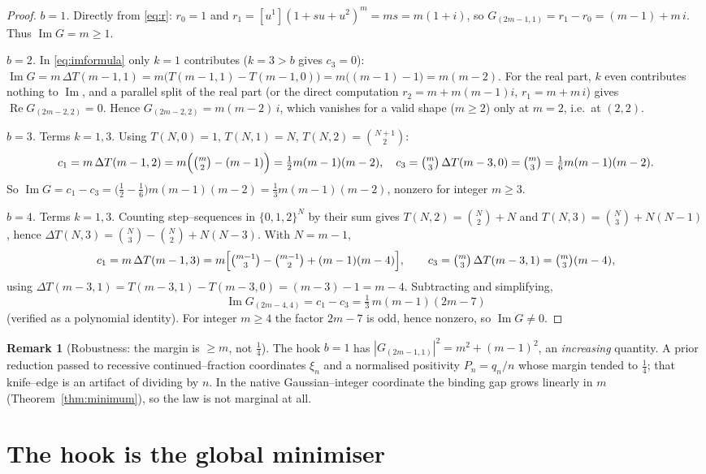 \documentclass[11pt]{article}
\theoremstyle{definition}
\newtheorem{remark}{Remark}
\renewcommand{\Re}{\operatorname{Re}}
\renewcommand{\Im}{\operatorname{Im}}
\newcommand{\im}{\Im}
\begin{document}
\begin{proof}
\emph{$b=1$.}  Directly from \eqref{eq:r}: $r_0=1$ and
$r_1=[u^1](1+su+u^2)^m=ms=m(1+i)$, so
$G_{(2m-1,1)}=r_1-r_0=(m-1)+m\,i$.  Thus $\im G=m\ge1$.

\emph{$b=2$.}  In \eqref{eq:imformula} only $k=1$ contributes ($k=3>b$ gives
$c_3=0$):
$\im G=m\,\Delta T(m-1,1)=m\bigl(T(m-1,1)-T(m-1,0)\bigr)=m\bigl((m-1)-1\bigr)=m(m-2)$.
For the real part, $k$ even contributes nothing to $\im$, and a parallel split of
the real part (or the direct computation $r_2=m+m(m-1)i$, $r_1=m+m\,i$) gives
$\Re G_{(2m-2,2)}=0$.  Hence $G_{(2m-2,2)}=m(m-2)\,i$, which vanishes for a valid
shape ($m\ge2$) only at $m=2$, i.e.\ at $(2,2)$.

\emph{$b=3$.}  Terms $k=1,3$.  Using $T(N,0)=1$, $T(N,1)=N$, $T(N,2)=\binom{N+1}{2}$:
\[
   c_1=m\,\Delta T(m-1,2)=m\Bigl(\tbinom{m}{2}-(m-1)\Bigr)=\tfrac12 m(m-1)(m-2),
   \quad
   c_3=\tbinom{m}{3}\,\Delta T(m-3,0)=\tbinom{m}{3}=\tfrac16 m(m-1)(m-2).
\]
So $\im G=c_1-c_3=\bigl(\tfrac12-\tfrac16\bigr)m(m-1)(m-2)=\tfrac13 m(m-1)(m-2)$,
nonzero for integer $m\ge3$.

\emph{$b=4$.}  Terms $k=1,3$.  Counting step--sequences in $\{0,1,2\}^N$ by their
sum gives $T(N,2)=\binom N2+N$ and $T(N,3)=\binom N3+N(N-1)$, hence
$\Delta T(N,3)=\binom N3-\binom N2+N(N-3)$.  With $N=m-1$,
\[
   c_1=m\,\Delta T(m-1,3)
      =m\Bigl[\tbinom{m-1}{3}-\tbinom{m-1}{2}+(m-1)(m-4)\Bigr],
   \qquad
   c_3=\tbinom m3\,\Delta T(m-3,1)=\tbinom m3(m-4),
\]
using $\Delta T(m-3,1)=T(m-3,1)-T(m-3,0)=(m-3)-1=m-4$.  Subtracting and
simplifying,
\[
   \im G_{(2m-4,4)}=c_1-c_3=\tfrac13\,m(m-1)(2m-7)
\]
(verified as a polynomial identity).  For integer $m\ge4$ the factor $2m-7$ is
odd, hence nonzero, so $\im G\neq0$.
\end{proof}

\begin{remark}[Robustness: the margin is $\ge m$, not $\tfrac14$]
The hook $b=1$ has $|G_{(2m-1,1)}|^2=m^2+(m-1)^2$, an \emph{increasing} quantity.
A prior reduction passed to recessive continued--fraction coordinates
$\xi_n$ and a normalised positivity $P_n=q_n/n$ whose margin tended to
$\tfrac14$; that knife--edge is an artifact of dividing by $n$.  In the native
Gaussian--integer coordinate the binding gap grows linearly in $m$
\textup(Theorem~\ref{thm:minimum}\textup), so the law is not marginal at all.
\end{remark}

\section{The hook is the global minimiser}
\end{document}
